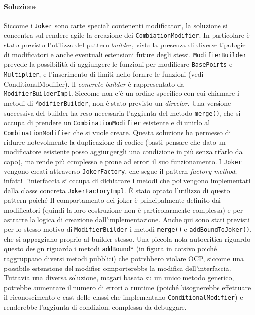 \documentclass[a4paper,12pt]{report}
\begin{document}
\paragraph{Soluzione}
Siccome i \texttt{Joker} sono carte speciali contenenti modificatori, la soluzione si concentra sul rendere agile la creazione dei \texttt{CombiationModifier}. In particolare è stato previsto l’utilizzo del pattern \textit{builder}, vista la presenza di diverse tipologie di modificatori e anche eventuali estensioni future degli stessi. \texttt{ModifierBuilder} prevede la possibilità di aggiungere le funzioni per modificare \texttt{BasePoints} e \texttt{Multiplier}, e l’inserimento di limiti nello fornire le funzioni (vedi ConditionalModifier). Il \textit{concrete builder} è rappresentato da \texttt{ModifierBuilderImpl}. Siccome non c’è un ordine specifico con cui chiamare i metodi di \texttt{ModifierBuilder}, non è stato previsto un \textit{director}. Una versione successiva del builder ha reso necessaria l’aggiunta del metodo \texttt{merge()}, che si occupa di prendere un \texttt{CombinationModifier} esistente e di unirlo al \texttt{CombinationModifier} che si vuole creare. Questa soluzione ha permesso di ridurre notevolmente la duplicazione di codice (basti pensare che dato un modificatore esistente posso aggiungergli una condizione in più senza rifarlo da capo), ma rende più complesso e prone ad errori il suo funzionamento.
I \texttt{Joker} vengono creati attraverso \texttt{JokerFactory}, che segue il pattern \textit{factory method}; infatti l’interfaccia si occupa di dichiarare i metodi che poi vengono implementati dalla classe concreta \texttt{JokerFactoryImpl}. È stato optato l’utilizzo di questo pattern poiché Il comportamento dei joker è principalmente definito dai modificatori (quindi la loro costruzione non è particolarmente complessa) e per astrarre la logica di creazione dall’implementazione. Anche qui sono stati previsti per lo stesso motivo di \texttt{ModifierBuilder} i metodi \texttt{merge()} e \texttt{addBoundToJoker()}, che si appoggiano proprio al builder stesso. 
Una piccola nota autocritica riguardo questo design riguarda i metodi \texttt{addBound*} (in figura in corsivo poiché raggruppano diversi metodi pubblici) che potrebbero violare OCP, siccome una possibile estensione del modifier comporterebbe la modifica dell’interfaccia. Tuttavia una diversa soluzione, magari basata su un unico metodo generico, potrebbe aumentare il numero di errori a runtime (poiché bisognerebbe effettuare il riconoscimento e cast delle classi che implementano \texttt{ConditionalModifier}) e renderebbe l’aggiunta di condizioni complessa da debuggare.
\end{document}
